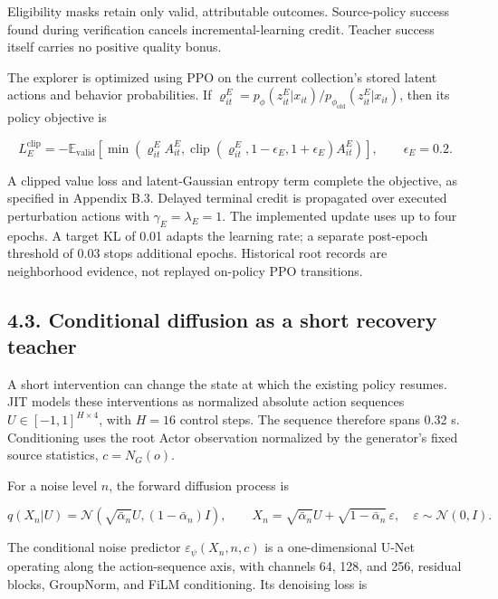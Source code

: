 \documentclass[
  american,
  11pt,
  a4paper,
]{article}
\begin{document}
Eligibility masks retain only valid, attributable outcomes.
Source-policy success found during verification cancels
incremental-learning credit. Teacher success itself carries no positive
quality bonus.

The explorer is optimized using PPO \cite{schulman2017ppo} on the current collection's
stored latent actions and behavior probabilities. If
\(\varrho_{it}^E=p_\phi(z_{it}^E|x_{it})/p_{\phi_{\mathrm{old}}}(z_{it}^E|x_{it})\),
then its policy objective is

\[
L_E^{\mathrm{clip}}
=-\mathbb E_{\mathrm{valid}}\!\left[
\min\left(\varrho_{it}^E A_{it}^E,
\operatorname{clip}(\varrho_{it}^E,1-\epsilon_E,1+\epsilon_E)A_{it}^E\right)
\right],\qquad \epsilon_E=0.2.
\tag{14}\label{eq:14}
\]

A clipped value loss and latent-Gaussian entropy term complete the
objective, as specified in Appendix B.3. Delayed terminal credit is
propagated over executed perturbation actions with
\(\gamma_E=\lambda_E=1\). The implemented update uses up to four epochs.
A target KL of 0.01 adapts the learning rate; a separate post-epoch
threshold of 0.03 stops additional epochs. Historical root records are
neighborhood evidence, not replayed on-policy PPO transitions.

\subsection{4.3. Conditional diffusion as a short recovery
teacher}\label{conditional-diffusion-as-a-short-recovery-teacher}

A short intervention can change the state at which the existing policy
resumes. JIT models these interventions as normalized absolute action
sequences \(U\in[-1,1]^{H\times4}\), with \(H=16\) control steps. The
sequence therefore spans 0.32 s. Conditioning uses the root Actor
observation normalized by the generator's fixed source statistics,
\(c=N_G(o)\).

For a noise level \(n\), the forward diffusion process is

\[
q(X_n|U)=
\mathcal N\!\left(\sqrt{\bar\alpha_n}U,(1-\bar\alpha_n)I\right),
\qquad
X_n=\sqrt{\bar\alpha_n}U+\sqrt{1-\bar\alpha_n}\,\varepsilon,
\quad\varepsilon\sim\mathcal N(0,I).
\tag{15}\label{eq:15}
\]

The conditional noise predictor \(\varepsilon_\psi(X_n,n,c)\) is a
one-dimensional U-Net operating along the action-sequence axis, with
channels 64, 128, and 256, residual blocks, GroupNorm, and FiLM
conditioning. Its denoising loss is
\end{document}
